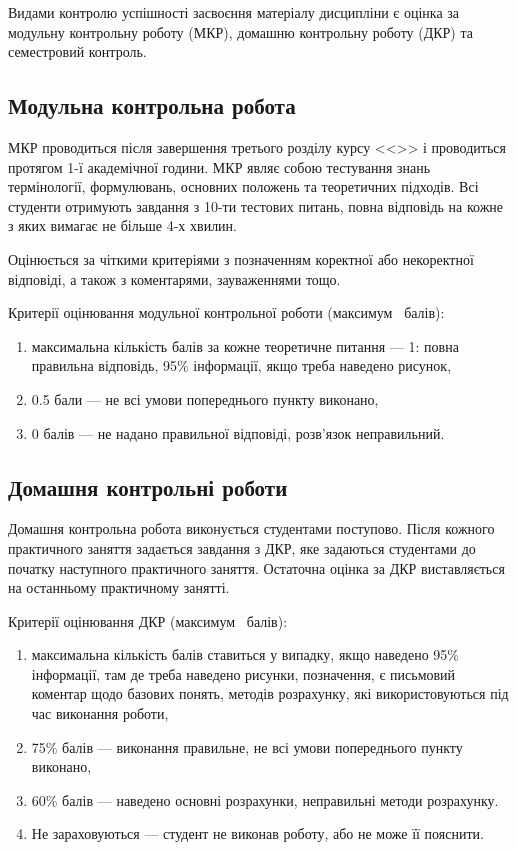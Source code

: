 \documentclass{Syllabus}
\begin{document}
Видами контролю успішності засвоєння матеріалу дисципліни є оцінка за модульну контрольну роботу (МКР), домашню контрольну роботу (ДКР) та семестровий контроль.

\subsection*{Модульна контрольна робота}

МКР проводиться після завершення третього розділу курсу <<\discipline>> і проводиться протягом 1-ї академічної години. МКР являє собою тестування знань термінології, формулювань, основних положень та теоретичних підходів. Всі студенти отримують завдання з 10-ти тестових питань, повна відповідь на кожне з яких вимагає не більше 4-х хвилин.

Оцінюється за чіткими критеріями з позначенням коректної або некоректної відповіді, а також з коментарями, зауваженнями тощо.

Критерії оцінювання модульної контрольної роботи (максимум \mkrBal~балів):
\begin{enumerate}[label=$\bullet$]
    \item максимальна кількість балів за кожне теоретичне питання --- 1: повна правильна відповідь, 95\% інформації, якщо треба наведено рисунок, \item 0.5 бали --- не всі умови попереднього пункту виконано,
    \item 0 балів --- не надано правильної відповіді, розв’язок неправильний.
\end{enumerate}

\subsection*{Домашня контрольні роботи}

Домашня контрольна робота виконується студентами поступово. Після кожного практичного заняття задається завдання з ДКР, яке задаються студентами до початку наступного практичного заняття. Остаточна оцінка за ДКР виставляється на останньому практичному  занятті.

Критерії оцінювання ДКР (максимум \dkrBal~балів):
\begin{enumerate}[label=$\bullet$]
    \item максимальна кількість балів ставиться у випадку, якщо наведено 95\% інформації, там де треба наведено рисунки, позначення, є письмовий коментар щодо базових понять, методів розрахунку, які використовуються під час виконання роботи,
    \item 75\% балів --- виконання правильне, не всі умови попереднього пункту виконано,
    \item 60\% балів --- наведено основні розрахунки, неправильні методи розрахунку.
    \item Не зараховуються --- студент не виконав роботу, або не може її пояснити.
\end{enumerate}
\end{document}

